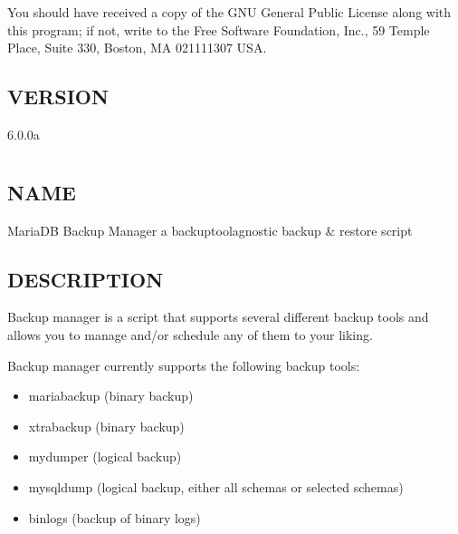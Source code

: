 \documentclass[letterpaper,10pt,english]{sphinxmanual}
\begin{document}
\sphinxAtStartPar
You should have received a copy of the GNU General Public License along with
this program; if not, write to the Free Software Foundation, Inc., 59 Temple
Place, Suite 330, Boston, MA  02111\sphinxhyphen{}1307  USA.


\section{VERSION}
\label{\detokenize{mariadb-archiver:version}}
\sphinxAtStartPar
{} 6.0.0a


\chapter{}
\label{\detokenize{mariadb-backup-manager:mariadb-backup-manager}}\label{\detokenize{mariadb-backup-manager::doc}}

\section{NAME}
\label{\detokenize{mariadb-backup-manager:name}}
\sphinxAtStartPar
MariaDB Backup Manager \sphinxhyphen{} a backup\sphinxhyphen{}tool\sphinxhyphen{}agnostic backup \& restore script


\section{DESCRIPTION}
\label{\detokenize{mariadb-backup-manager:description}}
\sphinxAtStartPar
Backup manager is a script that supports several different backup tools and
allows you to manage and/or schedule any of them to your liking.

\sphinxAtStartPar
Backup manager currently supports the following backup tools:
\begin{itemize}
\item {} 
\sphinxAtStartPar
mariabackup (binary backup)

\item {} 
\sphinxAtStartPar
xtrabackup (binary backup)

\item {} 
\sphinxAtStartPar
mydumper (logical backup)

\item {} 
\sphinxAtStartPar
mysqldump (logical backup, either all schemas or selected schemas)

\item {} 
\sphinxAtStartPar
binlogs (backup of binary logs)

\end{itemize}
\end{document}
